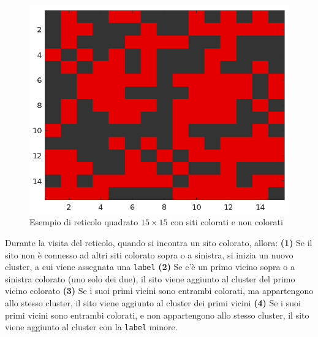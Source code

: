\begin{figure}[H]
\begin{minipage}{0.4\textwidth}
\begin{tabular}{|*{15}{c|}}
			\hline
		\end{tabular}
	\end{minipage}
	\hfill
	\begin{minipage}{0.44\textwidth}
		\centering
		\includegraphics[width=\linewidth]{images/basegrid}
	\end{minipage}
	\label{fig:basegrid}
	\caption{Esempio di reticolo quadrato $15 \times 15$ con siti colorati e non colorati}
\end{figure}
\noindent
Durante la visita del reticolo, quando si incontra un sito colorato, allora: \textbf{(1)} Se il sito non è connesso ad altri siti colorato sopra o a sinistra, si inizia un nuovo cluster, a cui viene assegnata una \texttt{label} \textbf{(2)} Se c’è un primo vicino sopra o a sinistra colorato (uno solo dei due), il sito viene aggiunto al cluster del primo vicino colorato \textbf{(3)} Se i suoi primi vicini sono entrambi colorati, ma appartengono allo stesso cluster, il sito viene aggiunto al cluster dei primi vicini \textbf{(4)} Se i suoi primi vicini sono entrambi colorati, e non appartengono allo stesso cluster, il sito viene aggiunto al cluster con la \texttt{label} minore. 
